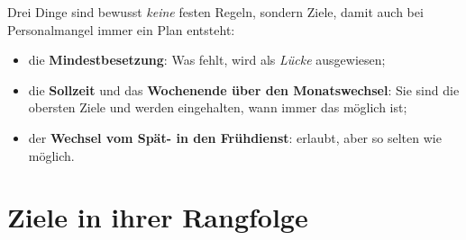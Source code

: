 \documentclass[11pt]{combiArticle}
\begin{document}
Drei Dinge sind bewusst \emph{keine} festen Regeln, sondern Ziele, damit auch bei Personalmangel immer ein Plan
entsteht:
\begin{itemize}
  \item die \textbf{Mindestbesetzung}: Was fehlt, wird als \emph{Lücke} ausgewiesen;
  \item die \textbf{Sollzeit} und das \textbf{Wochenende über den Monatswechsel}: Sie sind die obersten Ziele und
        werden eingehalten, wann immer das möglich ist;
  \item der \textbf{Wechsel vom Spät- in den Frühdienst}: erlaubt, aber so selten wie möglich.
\end{itemize}

\section{Ziele in ihrer Rangfolge}\label{sec:ziele}
\end{document}
